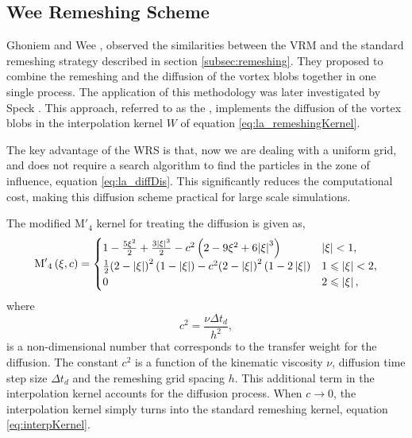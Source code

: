 \subsection{Wee Remeshing Scheme}
\label{subsec:modifiedRemeshing}

Ghoniem and Wee \cite{Wee2006a}, observed the similarities between the VRM and the standard remeshing strategy described in section \ref{subsec:remeshing}. They proposed to combine the remeshing and the diffusion of the vortex blobs together in one single process. The application of this methodology was later investigated by Speck \cite{Speck2011a}. This approach, referred to as the , implements the diffusion of the vortex blobs in the interpolation kernel $W$ of equation \ref{eq:la_remeshingKernel}.

The key advantage of the WRS is that, now we are dealing with a uniform grid, and does not require a search algorithm to find the particles in the zone of influence, equation \ref{eq:la_diffDis}. This significantly reduces the computational cost, making this diffusion scheme practical for large scale simulations. 

The modified $\mathrm{M'}_4$ kernel for treating the diffusion is given as,
	\begin{equation}
	{{{\rm{M'}}}_4}\left( {\xi ,c} \right) =
	  \begin{cases}
	   {1 - \frac{{5{\xi ^2}}}{2} + \frac{{3{{\left| \xi  \right|}^3}}}{2} - {c^2}\left( {2 - 9{\xi ^2} + 6{{\left| \xi  \right|}^3}} \right)} & {\left| \xi \right|} < 1, \\
	   \frac{1}{2}{\left( {2 - \left| \xi  \right|} \right)^2}\left( {1 - \left| \xi  \right|} \right) - {c^2}{\left( {2 - \left| \xi  \right|} \right)^2}\left( {1 - 2\left| \xi  \right|} \right) & 1 \leqslant {\left| \xi \right|} < 2,\\
	   0 & 2 \leqslant \left| \xi \right|,
	  \end{cases}
	\label{eq:modInterpKernel}
	\end{equation}
where 
	\begin{equation}
	c^2 = \frac{\nu \Delta t_d}{h^2},
	\label{eq:c2}
	\end{equation}
is a non-dimensional number that corresponds to the transfer weight for the diffusion. The constant $c^2$ is a function of the kinematic viscosity $\nu$, diffusion time step size $\Delta t_d$ and the remeshing grid spacing $h$. This additional term in the interpolation kernel accounts for the diffusion process. When $c \rightarrow 0$, the interpolation kernel simply turns into the standard remeshing kernel, equation \ref{eq:interpKernel}. 

